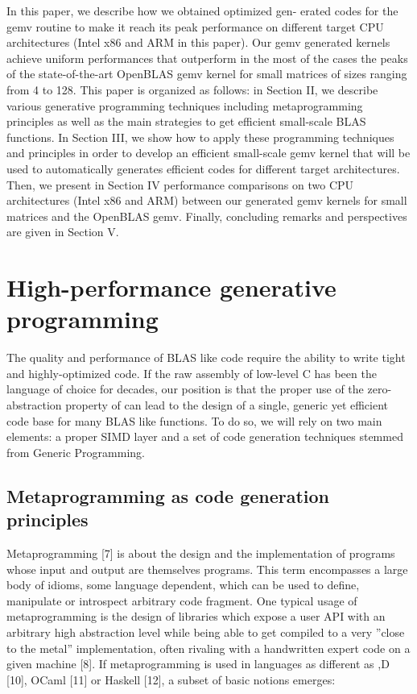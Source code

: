 \documentclass[../../main.tex]{subfiles}
\begin{document}
In this paper, we describe how we obtained optimized gen-
erated \cpp codes for the gemv routine to make it reach its
peak performance on different target CPU architectures (Intel
x86 and ARM in this paper). Our gemv \cpp generated kernels
achieve uniform performances that outperform in the most of
the cases the peaks of the state-of-the-art OpenBLAS gemv
kernel for small matrices of sizes ranging from 4 to 128.
This paper is organized as follows: in Section II, we describe
various generative programming techniques including metaprogramming
principles as well as the main strategies to get
efficient small-scale BLAS functions. In Section III, we show
how to apply these programming techniques and principles
in order to develop an efficient small-scale gemv kernel that
will be used to automatically generates efficient \cpp codes for
different target architectures. Then, we present in Section IV
performance comparisons on two CPU architectures (Intel
x86 and ARM) between our generated gemv kernels for
small matrices and the OpenBLAS gemv. Finally, concluding
remarks and perspectives are given in Section V.

\section{High-performance generative programming}

The quality and performance of BLAS like code require
the ability to write tight and highly-optimized code. If the
raw assembly of low-level C has been the language of choice
for decades, our position is that the proper use of the zero-
abstraction property of \cpp can lead to the design of a single,
generic yet efficient code base for many BLAS like functions.
To do so, we will rely on two main elements: a proper \cpp
SIMD layer and a set of code generation techniques stemmed
from Generic Programming.

\subsection{Metaprogramming as code generation principles}

Metaprogramming [7] is about the design and the
implementation of programs whose input and output
are themselves programs. This term encompasses a large
body of idioms, some language dependent, which can be used
to define, manipulate or introspect arbitrary code fragment.
One typical usage of metaprogramming is the design of
libraries which expose a user API with an arbitrary high
abstraction level while being able to get compiled to a very
”close to the metal” implementation, often rivaling with a
handwritten expert code on a given machine [8].
If metaprogramming is used in languages as different as
\cpp [9],D [10], OCaml [11] or Haskell [12], a subset of
basic notions emerges:
\end{document}
